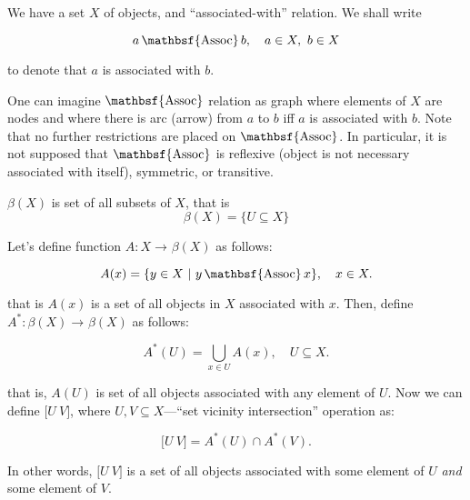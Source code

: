 \documentclass[a4paper, oneside, fleqn]{article}
\makeatletter
\def\qopname@#1{\mathop{\fam 0#1}\nolimits}
\newcommand{\mathsign}[1]
	{\index{#1@$\mathbsf{#1}$}\qopname@{\mathbsf{#1}}}
\def\As{\mathsign{Assoc}}
\newcommand{\svi}[2]
    {\texttt{[} #1 \ V \texttt{]}}
\makeatother
\begin{document}
\thispagestyle{empty}


We have a set $X$ of objects, and ``associated-with'' relation. We shall write

$$a\As b, \quad a\in X, \ b\in X$$

to denote that $a$ is associated with $b$.

One can imagine $\As$ relation as graph where elements of $X$ are nodes and
where there is arc (arrow) from $a$ to $b$ iff $a$ is associated with
$b$. Note that no further restrictions are placed on $\As$. In particular, it
is not supposed that $\As$ is reflexive (object is not necessary associated
with itself), symmetric, or transitive.

$\beta(X)$ is set of all subsets of $X$, that is $$\beta(X) = \{ U \subseteq X
\}$$

Let's define function $A:X\to^{}\beta(X)$ as follows:

$$A(x)=\{y\in X\ |\ y\As x\}, \quad x\in X.$$

that is $A(x)$ is a set of all objects in $X$ associated with $x$.
Then, define \mbox{$A^*:\beta(X)\to^{}\beta(X)$} as follows:

$$A^*(U)=\bigcup\limits_{x\in U} A(x), \quad U\subseteq X.$$

that is, $A(U)$ is set of all objects associated with any element of $U$. Now
we can define $\svi{U}{V}$, where $U, V\subseteq X$---``set vicinity
intersection'' operation as:


$$\svi{U}{V} = A^*(U) \cap A^*(V).$$

In other words, $\svi{U}{V}$ is a set of all objects associated with some
element of $U$ \emph{and} some element of $V$.
\end{document}
